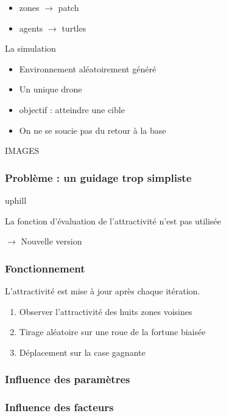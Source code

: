 \documentclass{beamer}
\begin{document}
\begin{block}

  \begin{block}
    \begin{itemize}
    \item{zones $\rightarrow$ patch}
    \item{agents $\rightarrow$ turtles}
    \end{itemize}
  \end{block}

  \begin{block}{La simulation}
    \begin{itemize}
    \item{Environnement aléatoirement généré}
    \item{Un unique drone}
    \item{objectif : atteindre une cible}
    \item{On ne se soucie pas du retour à la base}
    \end{itemize}
  \end{block}

\end{block}

\begin{block}

  IMAGES

\end{block}

\begin{block}

  \frametitle{Problème : un guidage trop simpliste}

  uphill

  La fonction d'évaluation de l'attractivité n'est pas utilisée

  $\rightarrow$ Nouvelle version

\end{block}

\begin{block}

  \frametitle{Fonctionnement}

  L'attractivité est mise à jour après chaque itération.

  \begin{enumerate}
  \item{Observer l'attractivité des huits zones voisines}
  \item{Tirage aléatoire sur une roue de la fortune biaisée}
  \item{Déplacement sur la case gagnante}
  \end{enumerate}

\end{block}

\begin{block}

  \frametitle{Influence des paramètres}

\end{block}

\begin{block}

  \frametitle{Influence des facteurs}

\end{block}
\end{document}
